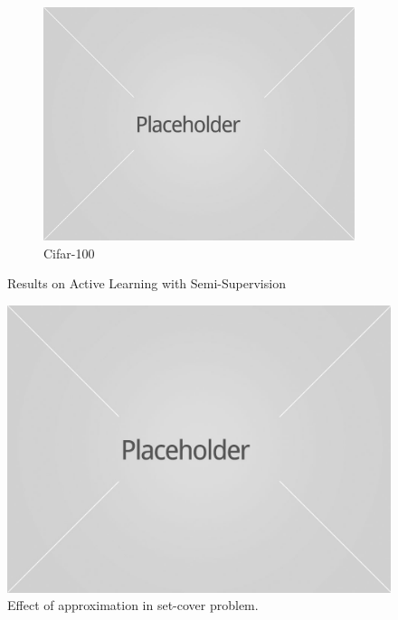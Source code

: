 \documentclass{article}
\begin{document}
\begin{figure}
    \begin{subfigure}[b]{0.3239\textwidth}
        \includegraphics[width=\textwidth]{placeholder1.jpg}
        \caption{Cifar-100}
    \end{subfigure}
    \caption{Results on Active Learning with Semi-Supervision}\label{fig:ressemi}
\end{figure}


\begin{figure}[h]
\includegraphics[width=\columnwidth]{placeholder1.jpg}
\caption{Effect of approximation in set-cover problem.}
\end{figure}
\end{document}
